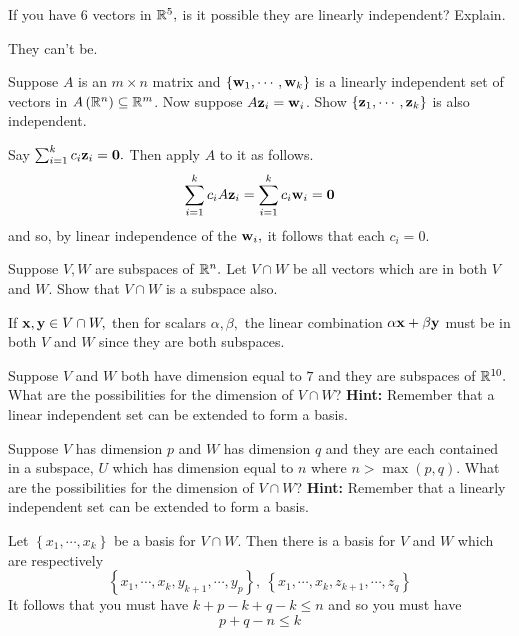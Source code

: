 \begin{enumialphparenastyle}
\begin{ex} If you have $6$ vectors in $\mathbb{R}^{5},$ is it possible they are
linearly independent? Explain.
\begin{sol}
They can't be.
\end{sol}
\end{ex}


\begin{ex} Suppose $A$ is an $m\times n$ matrix and $\left\{ {\bf w}
_{1},\cdots ,{\bf w}_{k}\right\} $ is a linearly independent set of
vectors in $A\left( \mathbb{R}^{n}\right) \subseteq \mathbb{R}^{m}$. Now
suppose $A{\bf z}_{i}={\bf w}_{i}$. Show $\left\{ 
{\bf z}_{1},\cdots ,{\bf z}_{k}\right\} $ is also independent. 
\begin{sol}
 Say $
\sum_{i=1}^{k}c_{i}{\bf z}_{i}={\bf 0}.$ Then apply $A$ to it as follows.
\[
\sum_{i=1}^{k}c_{i}A{\bf z}_{i}=\sum_{i=1}^{k}c_{i}{\bf w}_{i}={\bf 0}
\]
and so, by linear independence of the ${\bf w}_{i},$ it follows that each
$c_{i}=0$.
\end{sol}
\end{ex}

\begin{ex} Suppose $V, W$ are subspaces of $\mathbb{R}^{n}.$ Let $V\cap W$
be all vectors which are in both $V$ and $W$. Show that $V \cap W$ is a subspace also. 
\begin{sol}
If ${\bf x}, {\bf y}\in V\cap W,$ then for scalars $\alpha
,\beta ,$ the linear combination $\alpha {\bf x}+\beta {\bf y}$ must
be in both $V$ and $W$ since they are both subspaces.
\end{sol}
\end{ex}

\begin{ex} Suppose $V$ and $W$ both have dimension equal to $7$ and they are
subspaces of $\mathbb{R}^{10}.$ What are the possibilities for the dimension
of $V\cap W$? \textbf{Hint: }Remember that a linear independent set can be
extended to form a basis. \vspace{1mm}
\end{ex}

\begin{ex} Suppose $V$ has dimension $p$ and $W$ has dimension $q$ and they
are each contained in a subspace, $U$ which has dimension equal to $n$ where 
$n>\max \left( p,q\right) .$ What are the possibilities for the dimension of 
$V\cap W$? \textbf{Hint: }Remember that a linearly independent set can be
extended to form a basis. \vspace{1mm}
\begin{sol}
Let $\left\{ x_{1},\cdots ,x_{k}\right\} $ be a
basis for $V\cap W.$ Then there is a basis for $V$ and $W$ which are
respectively
\[
\left\{ x_{1},\cdots ,x_{k},y_{k+1},\cdots ,y_{p}\right\} ,\ \left\{
x_{1},\cdots ,x_{k},z_{k+1},\cdots ,z_{q}\right\}
\]
It follows that you must have $k+p-k+q-k\leq n$ and so you must have
\[
p+q-n\leq k
\]
\end{sol}
\end{ex}


\end{enumialphparenastyle}
